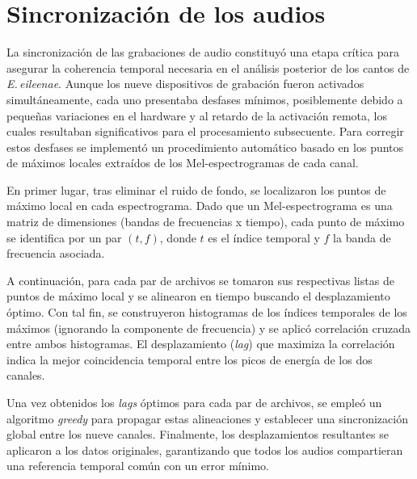 
\section{Sincronización de los audios}
\label{sec:sincronizacion}

La sincronización de las grabaciones de audio constituyó una 
etapa crítica para asegurar la coherencia temporal necesaria en 
el análisis posterior de los cantos de \emph{E.\,eileenae}. 
Aunque los nueve dispositivos de grabación fueron activados 
simultáneamente, cada uno presentaba desfases mínimos, posiblemente 
debido a pequeñas variaciones en el hardware y al retardo de 
la activación remota, los cuales 
resultaban significativos para el procesamiento subsecuente. 
Para corregir estos 
desfases se implementó un procedimiento automático basado en 
los puntos de máximos locales extraídos de los Mel-espectrogramas de cada 
canal.

En primer lugar, tras eliminar el ruido de fondo, se localizaron 
los puntos de máximo local en cada espectrograma. Dado que un 
Mel-espectrograma es una matriz de dimensiones (bandas de frecuencias x tiempo), 
cada punto de máximo se identifica por un par \((t,f)\), donde 
\(t\) es el índice temporal y \(f\) la banda de frecuencia 
asociada.

A continuación, para cada par de archivos se tomaron sus 
respectivas listas de puntos de máximo local y se alinearon en 
tiempo buscando el desplazamiento óptimo. Con tal fin, se 
construyeron histogramas de los índices temporales de los 
máximos (ignorando la componente de frecuencia) y se aplicó 
correlación cruzada entre ambos histogramas. 
El desplazamiento (\emph{lag}) que maximiza la correlación 
indica la mejor coincidencia temporal entre los picos de energía 
de los dos canales.

Una vez obtenidos los \emph{lags} óptimos para cada par de 
archivos, se empleó un algoritmo \textit{greedy} para propagar 
estas alineaciones y establecer una sincronización global entre 
los nueve canales. Finalmente, los desplazamientos resultantes 
se aplicaron a los datos originales, garantizando que todos los 
audios compartieran una referencia temporal común con un error 
mínimo.

